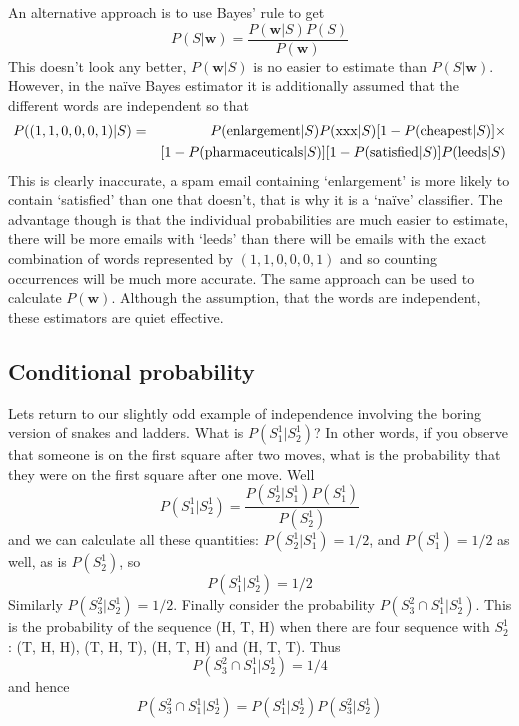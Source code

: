 \documentclass[11pt,a4paper]{scrartcl}
\begin{document}
An alternative approach is to use Bayes' rule to get
\begin{equation}
P(S|\textbf{w})=\frac{P(\textbf{w}|S)P(S)}{P(\textbf{w})}
\end{equation}
This doesn't look any better, $P(\textbf{w}|S)$ is no easier to
estimate than $P(S|\textbf{w})$. However, in the na\"{i}ve Bayes
estimator it is additionally assumed that the different words are
independent so that 
\begin{eqnarray}
P((1,1,0,0,0,1)|S)&=&P(\mbox{enlargement}|S)P(\mbox{xxx}|S)[1-P(\mbox{cheapest}|S)]\times\cr&&[1-P(\mbox{pharmaceuticals}|S)][1-P(\mbox{satisfied}|S)]P(\mbox{leeds}|S)
\end{eqnarray}
This is clearly inaccurate, a spam email containing
\lq{}enlargement\rq{} is more likely to contain \lq{}satisfied\rq{}
than one that doesn't, that is why it is a \lq{}na\"ive\rq{}
classifier. The advantage though is that the individual probabilities
are much easier to estimate, there will be more emails with
\lq{}leeds\rq{} than there will be emails with the exact
combination of words represented by $(1,1,0,0,0,1)$ and so counting
occurrences will be much more accurate. The same approach can be used
to calculate $P(\textbf{w})$. Although the assumption, that the words
are independent, these estimators are quiet effective. 

\subsection*{Conditional probability}

Lets return to our slightly odd example of independence involving the
boring version of snakes and ladders. What is $P(S_1^1|S_2^1)$? In
other words, if you observe that someone is on the first square after
two moves, what is the probability that they were on the first square
after one move. Well
\begin{equation}
P(S_1^1|S_2^1)=\frac{P(S_2^1|S_1^1)P(S_1^1)}{P(S_2^1)}
\end{equation}
and we can calculate all these quantities: $P(S_2^1|S_1^1)=1/2$, and
$P(S_1^1)=1/2$ as well, as is $P(S_2^1)$, so
\begin{equation}
P(S_1^1|S_2^1)=1/2
\end{equation}
Similarly $P(S_3^2|S_2^1)=1/2$. Finally consider the probability
$P(S_3^2\cap S_1^1|S_2^1)$. This is the probability of the sequence
(H, T, H) when there are four sequence with $S_2^1$: (T, H, H), (T, H,
T), (H, T, H) and (H, T, T). Thus 
\begin{equation}
P(S_3^2\cap S_1^1|S_2^1)=1/4
\end{equation}
and hence
\begin{equation}
P(S_3^2\cap S_1^1|S_2^1)=P(S_1^1|S_2^1)P(S_3^2|S_2^1)
\end{equation}
\end{document}
